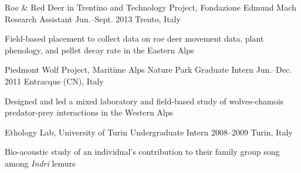 \begin{cventries}
  \cventry
    {Roe \& Red Deer in Trentino and Technology Project, Fondazione Edmund Mach} %
    {Research Assistant} %
    {Jun.--Sept. 2013} %
    {Trento, Italy} %
    {
      \begin{cvitems} %
        \item {Field-based placement to collect data on roe deer movement data, plant phenology, and pellet decay rate in the Eastern Alps}
      \end{cvitems}   
    }

  \cventry
    {Piedmont Wolf Project, Maritime Alps Nature Park} %
    {Graduate Intern} %
    {Jun.--Dec. 2011} %
    {Entracque (CN), Italy} %
    {
      \begin{cvitems} %
        \item {Designed and led a mixed laboratory and field-based study of wolves-chamois predator-prey interactions in the Western Alps}
      \end{cvitems} 
    }

  \cventry
    {Ethology Lab, University of Turin} %
    {Undergraduate Intern} %
    {2008--2009} %
    {Turin, Italy} %
    {
       \begin{cvitems} %
        \item {Bio-acoustic study of an individual's contribution to their family group song among \textit{Indri} lemurs}
      \end{cvitems} 
    }

\end{cventries}
